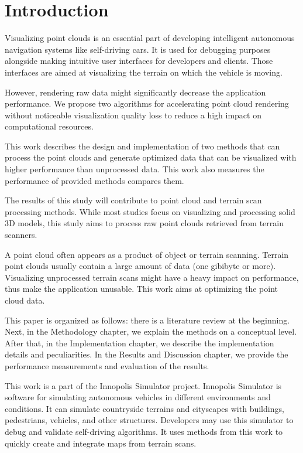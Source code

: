 \chapter{Introduction}
\label{chap:introduction}

Visualizing point clouds is an essential part of developing intelligent autonomous navigation systems like self-driving cars. It is used for debugging purposes alongside making intuitive user interfaces for developers and clients. Those interfaces are aimed at visualizing the terrain on which the vehicle is moving.

However, rendering raw data might significantly decrease the application performance. We propose two algorithms for accelerating point cloud rendering without noticeable visualization quality loss to reduce a high impact on computational resources.

This work describes the design and implementation of two methods that can process the point clouds and generate optimized data that can be visualized with higher performance than unprocessed data. This work also measures the performance of provided methods compares them.

The results of this study will contribute to point cloud and terrain scan processing methods. While most studies focus on visualizing and processing solid 3D models, this study aims to process raw point clouds retrieved from terrain scanners.

A point cloud often appears as a product of object or terrain scanning. Terrain point clouds usually contain a large amount of data (one gibibyte or more). Visualizing unprocessed terrain scans might have a heavy impact on performance, thus make the application unusable. This work aims at optimizing the point cloud data.

This paper is organized as follows: there is a literature review at the beginning. Next, in the Methodology chapter, we explain the methods on a conceptual level. After that, in the Implementation chapter, we describe the implementation details and peculiarities. In the Results and Discussion chapter, we provide the performance measurements and evaluation of the results.

This work is a part of the Innopolis Simulator project. Innopolis Simulator is software for simulating autonomous vehicles in different environments and conditions. It can simulate countryside terrains and cityscapes with buildings, pedestrians, vehicles, and other structures. Developers may use this simulator to debug and validate self-driving algorithms. It uses methods from this work to quickly create and integrate maps from terrain scans.
